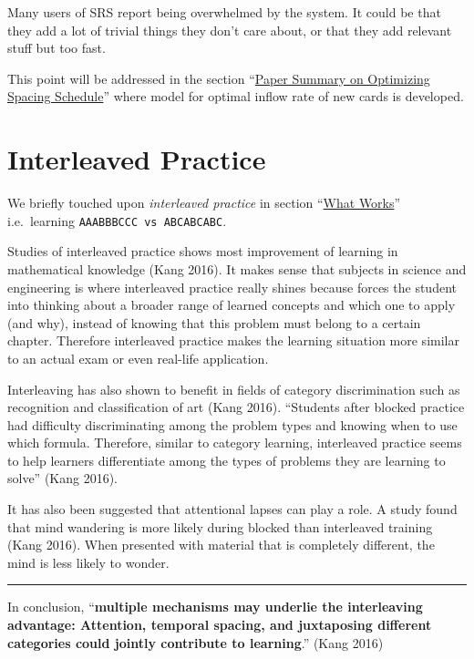 Many users of SRS report being overwhelmed by the system. It could be
that they add a lot of trivial things they don't care about, or that
they add relevant stuff but too fast.

This point will be addressed in the section
``\protect\hyperlink{paper-summary-on-optimizing-spacing-schedule}{Paper
Summary on Optimizing Spacing Schedule}'' where model for optimal inflow
rate of new cards is developed.

\pagebreak

\hypertarget{interleaved-practice}{\section{Interleaved
Practice}\label{interleaved-practice}}

We briefly touched upon \emph{interleaved practice} in section
``\protect\hyperlink{what-works}{What Works}'' i.e.~learning
\texttt{AAABBBCCC\ vs\ ABCABCABC}.

Studies of interleaved practice shows most improvement of learning in
mathematical knowledge (Kang 2016). It makes sense that subjects in
science and engineering is where interleaved practice really shines
because forces the student into thinking about a broader range of
learned concepts and which one to apply (and why), instead of knowing
that this problem must belong to a certain chapter. Therefore
interleaved practice makes the learning situation more similar to an
actual exam or even real-life application.

Interleaving has also shown to benefit in fields of category
discrimination such as recognition and classification of art (Kang
2016). ``Students after blocked practice had difficulty discriminating
among the problem types and knowing when to use which formula.
Therefore, similar to category learning, interleaved practice seems to
help learners differentiate among the types of problems they are
learning to solve'' (Kang 2016).

It has also been suggested that attentional lapses can play a role. A
study found that mind wandering is more likely during blocked than
interleaved training (Kang 2016). When presented with material that is
completely different, the mind is less likely to wonder.

\begin{center}\rule{0.5\linewidth}{\linethickness}\end{center}

In conclusion, ``\textbf{multiple mechanisms may underlie the
interleaving advantage: Attention, temporal spacing, and juxtaposing
different categories could jointly contribute to learning}.'' (Kang
2016)

